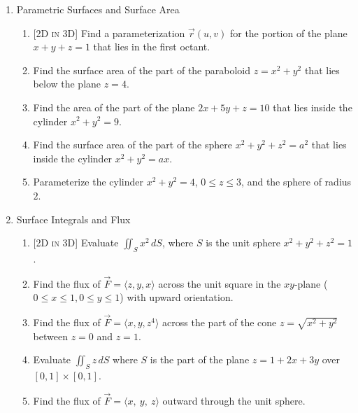 \documentclass[12pt]{article}
\newcommand{\dimtag}[1]{{\footnotesize\textsc{[#1]}}\;}
\begin{document}
\begin{enumerate}
\begin{enumerate}
        \item Prove that $\text{div}(\text{curl } \vec{F}) = 0$ for any smooth vector field $\vec{F}$.
        \item If $f(x,y,z)$ has continuous second partial derivatives, prove that $\text{curl}(\nabla f) = \vec{0}$.
        \item (Stewart \S16.5 \#21) Is there a vector field $\vec G$ on $\mathbb{R}^3$ such that $\operatorname{curl}\vec G = \langle x\sin y,\ \cos y,\ z - xy\rangle$? Explain.
        \item Find the curl and divergence of $\vec F=\langle x^2,\ y^2,\ z^2\rangle$ and of $\vec G=\langle e^{x}\sin y,\ e^{x}\cos y,\ z\rangle$.
    \end{enumerate}
\newpage

\item Parametric Surfaces and Surface Area
    \begin{enumerate}
        \item \dimtag{2D in 3D} Find a parameterization $\vec{r}(u, v)$ for the portion of the plane $x + y + z = 1$ that lies in the first octant.
        \item Find the surface area of the part of the paraboloid $z = x^2 + y^2$ that lies below the plane $z = 4$.
        \item Find the area of the part of the plane $2x + 5y + z = 10$ that lies inside the cylinder $x^2 + y^2 = 9$.
        \item Find the surface area of the part of the sphere $x^2+y^2+z^2 = a^2$ that lies inside the cylinder $x^2+y^2 = ax$.
        \item Parameterize the cylinder $x^2+y^2=4$, $0\le z\le 3$, and the sphere of radius $2$.
    \end{enumerate}
\bigskip

\item Surface Integrals and Flux
    \begin{enumerate}
        \item \dimtag{2D in 3D} Evaluate $\iint_S x^2 \, dS$, where $S$ is the unit sphere $x^2+y^2+z^2=1$.
        \item Find the flux of $\vec{F} = \langle z, y, x \rangle$ across the unit square in the $xy$-plane ($0 \le x \le 1, 0 \le y \le 1$) with upward orientation.
        \item Find the flux of $\vec{F} = \langle x, y, z^4 \rangle$ across the part of the cone $z = \sqrt{x^2+y^2}$ between $z=0$ and $z=1$.
        \item Evaluate $\iint_S z\,dS$ where $S$ is the part of the plane $z=1+2x+3y$ over $[0,1]\times[0,1]$.
        \item Find the flux of $\vec F=\langle x,\ y,\ z\rangle$ outward through the unit sphere.
    \end{enumerate}
\newpage


\end{enumerate}
\end{document}
